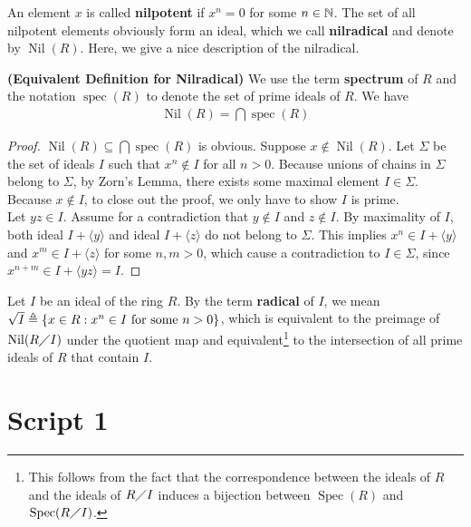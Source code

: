 \documentclass{report}
\begin{document}
An element $x$ is called \textbf{nilpotent} if $x^n=0$ for some  $n\in\mathbb{N}$. The set of all nilpotent elements obviously form an ideal, which we call \textbf{nilradical} and denote by $\operatorname{Nil}(R)$. Here, we give a nice description of the nilradical. 
\begin{theorem}
\textbf{(Equivalent Definition for Nilradical)} We use the term \textbf{spectrum} of $R$ and the notation  $\operatorname{spec}(R)$ to denote the set of prime ideals of $R$. We have 
 \begin{align*}
\operatorname{Nil}(R)=\bigcap \operatorname{spec}(R)
\end{align*}
\end{theorem}
\begin{proof}
$\operatorname{Nil}(R)\subseteq \bigcap \operatorname{spec}(R)$ is obvious. Suppose $x \not\in \operatorname{Nil}(R)$. Let $\Sigma$ be the set of ideals $I$ such that $x^n\not\in I$ for all $n>0$. Because unions of chains in $\Sigma$ belong to $\Sigma$, by Zorn's Lemma, there exists some maximal element $I \in \Sigma$. Because $x\not \in I$, to close out the proof, we only have to show $I$ is prime.\\

Let $yz \in I$. Assume for a contradiction that $y\not\in I$ and $z\not\in I$. By maximality of $I$, both ideal $I+ \langle y\rangle$ and ideal $I+\langle z\rangle$ do not belong to $\Sigma$. This implies $x^n \in I+ \langle y\rangle$ and $x^m \in I + \langle z\rangle $ for some $n,m>0$, which cause a contradiction to $I \in \Sigma$, since $x^{n+m} \in I + \langle yz\rangle =I$. 
\end{proof}

Let $I$ be an ideal of the ring $R$. By the term \textbf{radical} of $I$, we mean $\sqrt{I}\triangleq \{  x \in R : x^n \in I \text{ for some } n > 0  \}$, which is equivalent to  the preimage of $\operatorname{Nil}(R \diagup  I)$ under the quotient map and equivalent\footnote{This follows from the fact that the correspondence between the ideals of $R$ and the ideals of $R \diagup  I$ induces a bijection between $\operatorname{Spec}(R)$ and $\operatorname{Spec}(R \diagup  I)$.} to the intersection of all prime ideals of $R$ that contain $I$.
\section{Script 1}
\end{document}
